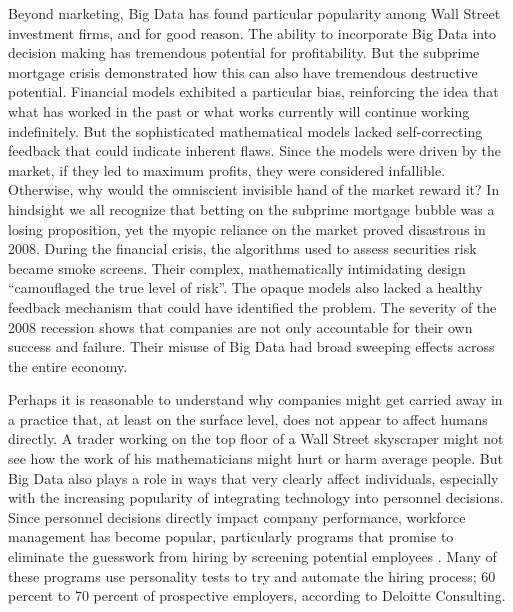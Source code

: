\documentclass[sigconf]{acmart}
\begin{document}
Beyond marketing, Big Data has found particular popularity among Wall Street investment firms, and for good reason. The ability to incorporate Big Data into decision making has tremendous potential for profitability. But the subprime mortgage crisis demonstrated how this can also have tremendous destructive potential. Financial models exhibited a particular bias, reinforcing the idea that what has worked in the past or what works currently will continue working indefinitely. But the sophisticated mathematical models lacked self-correcting feedback that could indicate inherent flaws. Since the models were driven by the market, if they led to maximum profits, they were considered infallible. Otherwise, why would the omniscient invisible hand of the market reward it? In hindsight we all recognize that betting on the subprime mortgage bubble was a losing proposition, yet the myopic reliance on the market proved disastrous in 2008. During the financial crisis, the algorithms used to assess securities risk became smoke screens. Their complex, mathematically intimidating design ``camouflaged the true level of risk''\cite{Wharton2016}. The opaque models also lacked a healthy feedback mechanism that could have identified the problem\cite{Wharton2016}. The severity of the 2008 recession shows that companies are not only accountable for their own success and failure. Their misuse of Big Data had broad sweeping effects across the entire economy.

Perhaps it is reasonable to understand why companies might get carried away in a practice that, at least on the surface level, does not appear to affect humans directly. A trader working on the top floor of a Wall Street skyscraper might not see how the work of his mathematicians might hurt or harm average people. But Big Data also plays a role in ways that very clearly affect individuals, especially with the increasing popularity of integrating technology into personnel decisions. Since personnel decisions directly impact company performance, workforce management has become popular, particularly programs that promise to eliminate the guesswork from hiring by screening potential employees \cite{Wharton2016}. Many of these programs use personality tests to try and automate the hiring process; 60 percent to 70 percent of prospective employers, according to Deloitte Consulting.
\end{document}
